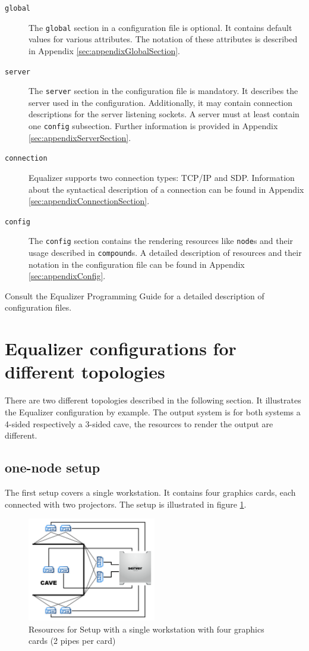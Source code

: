 \begin{description}
	\item[\texttt{global}] The \texttt{global} section in a configuration file is optional. It contains default values for various attributes. The notation of these attributes is described in Appendix \ref{sec:appendixGlobalSection}.
	\item[\texttt{server}] The \texttt{server} section in the configuration file is mandatory. It describes the server used in the configuration. Additionally, it may contain connection descriptions for the server listening sockets. A server must at least contain one \texttt{config} subsection. Further information is provided in Appendix \ref{sec:appendixServerSection}.
	\item[\texttt{connection}] Equalizer supports two connection types: TCP/IP and SDP. Information about the syntactical description of a connection can be found in Appendix \ref{sec:appendixConnectionSection}.
	\item[\texttt{config}] The \texttt{config} section contains the rendering resources like \texttt{node}s and their usage described in \texttt{compound}s. A detailed description of resources and their notation in the configuration file can be found in Appendix \ref{sec:appendixConfig}.
\end{description}

Consult the Equalizer Programming Guide\cite{eqPG} for a detailed description of configuration files.

\section{Equalizer configurations for different topologies}
There are two different topologies described in the following section. It illustrates the Equalizer configuration by example. The output system is for both systems a 4-sided respectively a 3-sided \gls{cave}, the resources to render the output are different.

\subsection{one-node setup}
The first setup covers a single workstation. It contains four graphics cards, each connected with two projectors. The setup is illustrated in figure \ref{fig:1nodeSetup}.

\begin{figure}[H]
	\centering
	\includegraphics[width=0.5\textwidth]{../figures/1node_architecture}
	\caption{Resources for Setup with a single workstation with four graphics cards (2 pipes per card)}
	\label{fig:1nodeSetup}
\end{figure}

